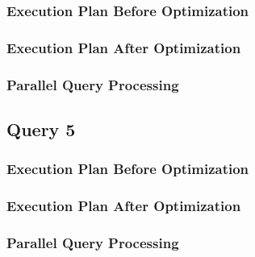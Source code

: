 \subsubsection{Execution Plan Before Optimization}
\subsubsection{Execution Plan After Optimization}
\subsubsection{Parallel Query Processing}

\subsection{Query 5}
\subsubsection{Execution Plan Before Optimization}
\subsubsection{Execution Plan After Optimization}
\subsubsection{Parallel Query Processing}
